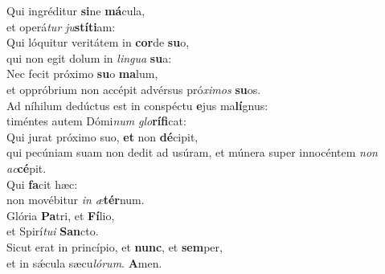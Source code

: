 \evenverse Qui ingréditur \textbf{si}ne \textbf{má}cula,~\*\\
\evenverse et operá\textit{tur} \textit{ju}\textbf{stí}\textbf{ti}am:\\
\oddverse Qui lóquitur veritátem in \textbf{cor}de \textbf{su}o,~\*\\
\oddverse qui non egit dolum in \textit{lin}\textit{gua} \textbf{su}a:\\
\evenverse Nec fecit próximo \textbf{su}o \textbf{ma}lum,~\*\\
\evenverse et oppróbrium non accépit advérsus pró\textit{xi}\textit{mos} \textbf{su}os.\\
\oddverse Ad níhilum dedúctus est in conspéctu \textbf{e}jus ma\textbf{lí}gnus:~\*\\
\oddverse timéntes autem Dómi\textit{num} \textit{glo}\textbf{rí}\textbf{fi}cat:\\
\evenverse Qui jurat próximo suo, \textbf{et} non \textbf{dé}cipit,~\*\\
\evenverse qui pecúniam suam non dedit ad usúram, et múnera super innocéntem \textit{non} \textit{ac}\textbf{cé}pit.\\
\oddverse Qui \textbf{fa}cit hæc:~\*\\
\oddverse non movébitur \textit{in} \textit{æ}\textbf{tér}num.\\
\evenverse Glória \textbf{Pa}tri, et \textbf{Fí}lio,~\*\\
\evenverse et Spirí\textit{tu}\textit{i} \textbf{San}cto.\\
\oddverse Sicut erat in princípio, et \textbf{nunc}, et \textbf{sem}per,~\*\\
\oddverse et in sǽcula sæcu\textit{ló}\textit{rum}. \textbf{A}men.\\
